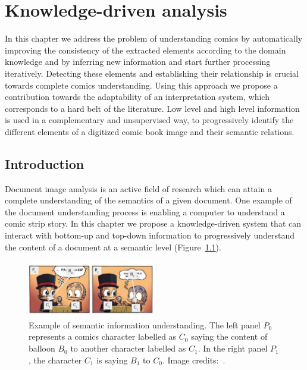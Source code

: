 \chapter{Knowledge-driven analysis}
\label{chap:knowledge}
\graphicspath{{./chapters/5-knowledge/figs/}}

In this chapter we address the problem of understanding comics by automatically improving the consistency of the extracted elements according to the domain knowledge and by inferring new information and start further processing iteratively.
Detecting these elements and establishing their relationship is crucial towards complete comics understanding.
Using this approach we propose a contribution towards the adaptability of an interpretation system, which corresponds to a hard belt of the literature.
Low level and high level information is used in a complementary and unsupervised way, to progressively identify the different elements of a digitized comic book image and their semantic relations.


\section{Introduction}
\label{sec:kn:introduction}


Document image analysis is an active field of research which can attain a complete understanding of the semantics of a given document.
One example of the document understanding process is enabling a computer to understand a comic strip story.
In this chapter we propose a knowledge-driven system that can interact with bottom-up and top-down information to progressively understand the content of a document at a semantic level (Figure~\ref{fig:kn:intro_illustration}).

 \begin{figure}[ht]  %
   \centering
  \includegraphics[trim= 0px 10px 3px 10px, clip, width=0.5\textwidth]{intro_illustration.pdf}
  \caption[Example of semantic information understanding]{Example of semantic information understanding. The left panel $P_0$ represents a comics character labelled as $C_0$ saying the content of balloon $B_0$ to another character labelled as $C_1$. In the right panel $P_1$, the character $C_1$ is saying $B_1$ to $C_0$. Image credits:~\cite{Magicien11}. }
  \label{fig:kn:intro_illustration}
 \end{figure}


